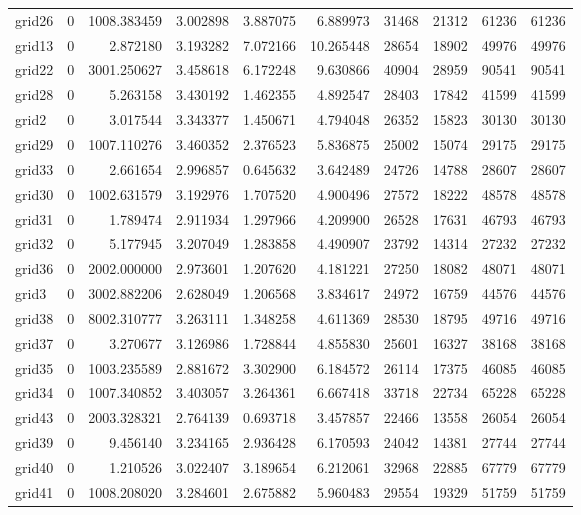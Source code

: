 \begin{longtable}{|l|r|r|r|r|r|r|r|r|r|}
grid26 & 0 & 1008.383459 & 3.002898 & 3.887075 & 6.889973 & 31468 & 21312 & 61236 & 61236 \\
grid13 & 0 & 2.872180 & 3.193282 & 7.072166 & 10.265448 & 28654 & 18902 & 49976 & 49976 \\
grid22 & 0 & 3001.250627 & 3.458618 & 6.172248 & 9.630866 & 40904 & 28959 & 90541 & 90541 \\
grid28 & 0 & 5.263158 & 3.430192 & 1.462355 & 4.892547 & 28403 & 17842 & 41599 & 41599 \\
grid2 & 0 & 3.017544 & 3.343377 & 1.450671 & 4.794048 & 26352 & 15823 & 30130 & 30130 \\
grid29 & 0 & 1007.110276 & 3.460352 & 2.376523 & 5.836875 & 25002 & 15074 & 29175 & 29175 \\
grid33 & 0 & 2.661654 & 2.996857 & 0.645632 & 3.642489 & 24726 & 14788 & 28607 & 28607 \\
grid30 & 0 & 1002.631579 & 3.192976 & 1.707520 & 4.900496 & 27572 & 18222 & 48578 & 48578 \\
grid31 & 0 & 1.789474 & 2.911934 & 1.297966 & 4.209900 & 26528 & 17631 & 46793 & 46793 \\
grid32 & 0 & 5.177945 & 3.207049 & 1.283858 & 4.490907 & 23792 & 14314 & 27232 & 27232 \\
grid36 & 0 & 2002.000000 & 2.973601 & 1.207620 & 4.181221 & 27250 & 18082 & 48071 & 48071 \\
grid3 & 0 & 3002.882206 & 2.628049 & 1.206568 & 3.834617 & 24972 & 16759 & 44576 & 44576 \\
grid38 & 0 & 8002.310777 & 3.263111 & 1.348258 & 4.611369 & 28530 & 18795 & 49716 & 49716 \\
grid37 & 0 & 3.270677 & 3.126986 & 1.728844 & 4.855830 & 25601 & 16327 & 38168 & 38168 \\
grid35 & 0 & 1003.235589 & 2.881672 & 3.302900 & 6.184572 & 26114 & 17375 & 46085 & 46085 \\
grid34 & 0 & 1007.340852 & 3.403057 & 3.264361 & 6.667418 & 33718 & 22734 & 65228 & 65228 \\
grid43 & 0 & 2003.328321 & 2.764139 & 0.693718 & 3.457857 & 22466 & 13558 & 26054 & 26054 \\
grid39 & 0 & 9.456140 & 3.234165 & 2.936428 & 6.170593 & 24042 & 14381 & 27744 & 27744 \\
grid40 & 0 & 1.210526 & 3.022407 & 3.189654 & 6.212061 & 32968 & 22885 & 67779 & 67779 \\
grid41 & 0 & 1008.208020 & 3.284601 & 2.675882 & 5.960483 & 29554 & 19329 & 51759 & 51759 \\

\end{longtable}
